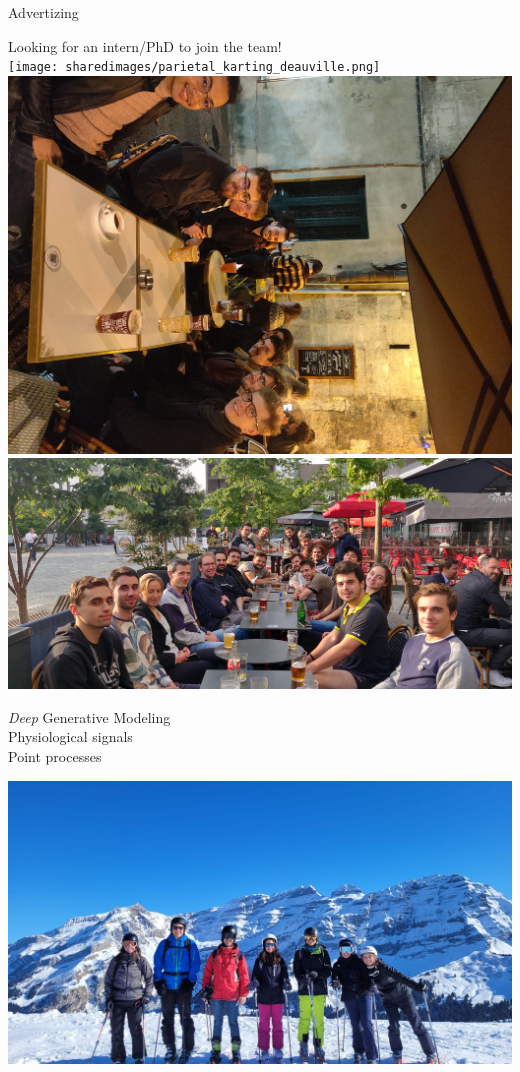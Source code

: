 \documentclass[unknownkeysallowed]{beamer}
\begin{document}
\begin{frame}{Advertizing}

    Looking for an intern/PhD to join the team!\\[2em]

    \centering
    \texttt{[image: sharedimages/parietal\_karting\_deauville.png]}
    \hfill\includegraphics[width=.3\textwidth]{sharedimages/bar1.jpg}
    \\[-3em]
    \includegraphics[width=.5\textwidth]{sharedimages/parietal_retreat.jpg}\\[-3em]
    \parbox[c]{.4\textwidth}{
        \centering \emph{Deep} Generative Modeling\\
        Physiological signals\\
        Point processes\\

    }\hfill\includegraphics[width=.5\textwidth]{sharedimages/parietal_ski.jpg}\\


\end{frame}
\end{document}
